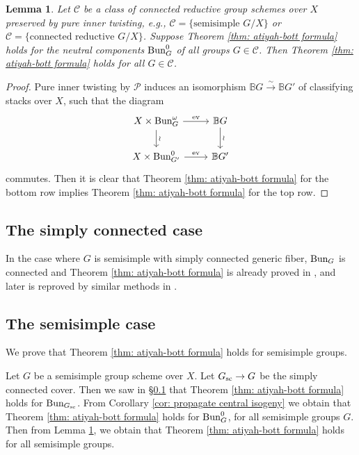\documentclass[reqno]{amsart}
\numberwithin{equation}{subsection}
\newtheorem{lemma}[subsubsection]{Lemma}
\theoremstyle{definition}
\def\BB{\mathbb{B}}
\newcommand\cC{\mathcal{C}}
\newcommand\cP{\mathcal{P}}
\newcommand{\Bun}{\textup{Bun}}
\newcommand\ev{\textup{ev}}
\renewcommand\sc{\textup{sc}}
\begin{document}
\begin{lemma}\label{lem: propagate pure inner twist}
Let $\cC$ be a class of connected reductive group schemes over $X$ preserved by pure inner twisting, e.g., $\cC = \{\text{semisimple } G/X\}$ or $\cC = \{\text{connected reductive } G/X\}$. Suppose Theorem \ref{thm: atiyah-bott formula} holds for the neutral components $\Bun_{G}^{0}$ of all groups $G \in \cC$. Then Theorem \ref{thm: atiyah-bott formula} holds for all $G \in \cC$. 
\end{lemma}

\begin{proof}
Pure inner twisting by $\cP$ induces an isomorphism $\BB G \xrightarrow{\sim} \BB G'$ of classifying stacks over $X$, such that the diagram 
\[
\begin{tikzcd}
X \times \Bun_G^\omega \ar[r, "\ev"]  \ar[d, "\wr"] & \BB G \ar[d, "\wr"] \\
X \times \Bun_{G'}^0 \ar[r, "\ev"]  &  \BB G'
\end{tikzcd}
\]
commutes. Then it is clear that Theorem \ref{thm: atiyah-bott formula} for the bottom row implies Theorem \ref{thm: atiyah-bott formula} for the top row. 
\end{proof}


\subsection{The simply connected case}\label{sssec: AB simply connected}

In the case where $G$ is semisimple with simply connected generic fiber, $\Bun_G$ is connected and Theorem \ref{thm: atiyah-bott formula} is already proved in \cite[(0.7)]{Gai19}, and later is reproved by similar methods in \cite[Theorem 6.13]{Ho21}.


\subsection{The semisimple case}

We prove that Theorem \ref{thm: atiyah-bott formula} holds for semisimple groups. 


Let $G$ be a semisimple group scheme over $X$. Let $G_{\sc} \rightarrow G$ be the simply connected cover. Then we saw in \S \ref{sssec: AB simply connected} that Theorem \ref{thm: atiyah-bott formula} holds for $\Bun_{G_{\sc}}$. From Corollary \ref{cor: propagate central isogeny} we obtain that Theorem \ref{thm: atiyah-bott formula} holds for $\Bun_G^0$, for all semisimple groups $G$. Then from Lemma \ref{lem: propagate pure inner twist}, we obtain that Theorem \ref{thm: atiyah-bott formula} holds for all semisimple groups. 
\end{document}
